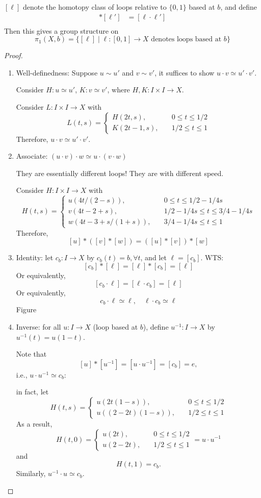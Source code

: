 \begin{proposition}
$[\ell]$ denote the homotopy class of loops relative to $\{0,1\}$ based at $b$, and define
\begin{align*}
[\ell]*[\ell']&=[\ell\cdot\ell']\\
\end{align*}
Then this gives a group structure on
\[
\pi_1(X,b) = \{[\ell]\mid \ell:[0,1]\to X\text{ denotes loops based at $b$}\} 
\]
\end{proposition}
\begin{proof}
\begin{enumerate}
\item
Well-definedness:
Suppose $u\sim u'$ and $v\sim v'$, it suffices to show $u\cdot v\simeq u'\cdot v'$.

Consider $H:u\simeq u'$, $K:v\simeq v'$, where 
$H,K:I\times I\to X$.

Consider $L:I\times I\to X$ with
\[
L(t,s)=\left\{
\begin{aligned}
H(2t,s),&\quad 0\le t\le 1/2\\
K(2t-1,s),&\quad 1/2\le t\le 1
\end{aligned}
\right.
\] 
Therefore, $u\cdot v\simeq u'\cdot v'$.
\item
Associate: $(u\cdot v)\cdot w\simeq u\cdot(v\cdot w)$

They are essentially different loops! They are with different speed.

Consider $H:I\times I\to X$ with
\[
H(t,s) = \left\{
\begin{aligned}
u(4t/(2-s)),&\quad 0\le t\le 1/2-1/4s\\
v(4t - 2+s),&\quad 1/2 - 1/4s\le t\le 3/4 - 1/4s\\
w(4t - 3+s/(1+s)),&\quad 3/4 - 1/4s\le t\le 1
\end{aligned}
\right.
\]
Therefore,
\[
[u]*([v]*[w])=([u]*[v])*[w]
\]
\item
Identity: let $c_b:I\to X$ by $c_b(t) = b,\forall t$, and let $\ell = [c_b]$. WTS:
\[
[c_b]*[\ell]=[\ell]*[c_b]=[\ell]
\]
Or equivalently,
\[
[c_b\cdot\ell]=[\ell\cdot c_b]=[\ell]
\]
Or equivalently,
\[
c_b\cdot\ell\simeq\ell,\quad
\ell\cdot c_b\simeq \ell
\]
Figure
\item
Inverse: for all $u:I\to X$ (loop based at $b$), define $u^{-1}:I\to X$ by $u^{-1}(t)=u(1-t)$.

Note that
\[
[u]*[u^{-1}]=[u\cdot u^{-1}]=[c_b] = e,
\]
i.e., $u\cdot u^{-1}\simeq c_b$:

in fact, let
\[
H(t,s)=\left\{
\begin{aligned}
u(2t(1-s)),&\quad 0\le t\le 1/2\\
u((2-2t)(1-s)),&\quad 1/2\le t\le 1
\end{aligned}
\right.
\]
As a result,
\[
H(t,0)=\left\{
\begin{aligned}
u(2t),&\quad 0\le t\le 1/2\\
u(2-2t),&\quad 1/2\le t\le 1
\end{aligned}
\right.
=
u\cdot u^{-1}
\]
and
\[
H(t,1) = c_b.
\]
Similarly, $u^{-1}\cdot u\simeq c_b$.
\end{enumerate}
\end{proof}


